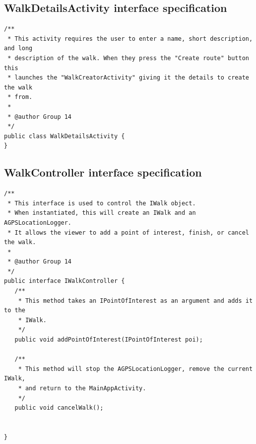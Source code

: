 \documentclass{project}
\begin{document}
\subsection{WalkDetailsActivity interface specification}
\begin{verbatim}/**
 * This activity requires the user to enter a name, short description, and long
 * description of the walk. When they press the "Create route" button this
 * launches the "WalkCreatorActivity" giving it the details to create the walk
 * from.
 *
 * @author Group 14
 */
public class WalkDetailsActivity {
}\end{verbatim}

\newpage

\subsection{WalkController interface specification}
\begin{verbatim}/**
 * This interface is used to control the IWalk object. 
 * When instantiated, this will create an IWalk and an AGPSLocationLogger.
 * It allows the viewer to add a point of interest, finish, or cancel the walk.
 *
 * @author Group 14
 */
public interface IWalkController {
   /**
    * This method takes an IPointOfInterest as an argument and adds it to the
    * IWalk.
    */
   public void addPointOfInterest(IPointOfInterest poi);
    
   /**
    * This method will stop the AGPSLocationLogger, remove the current IWalk,
    * and return to the MainAppActivity.
    */
   public void cancelWalk();
   
  
}\end{verbatim}

\newpage
\end{document}
